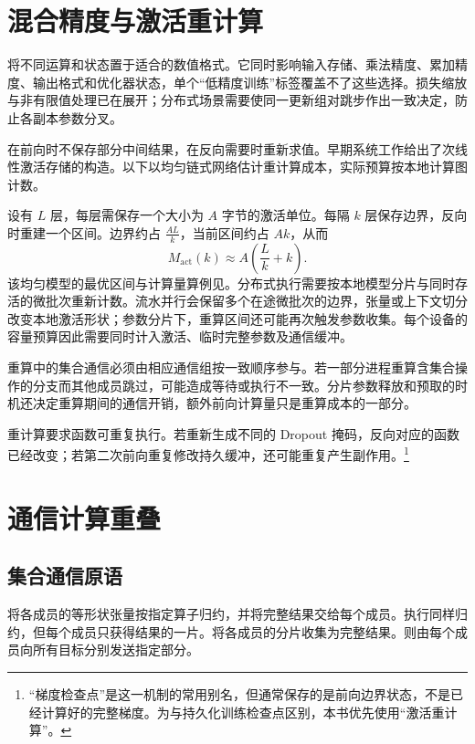 \documentclass[../textbook.tex]{subfiles}
\begin{document}
\section{混合精度与激活重计算}

将不同运算和状态置于适合的数值格式。它同时影响输入存储、乘法精度、累加精度、输出格式和优化器状态，单个“低精度训练”标签覆盖不了这些选择。损失缩放与非有限值处理已在展开；分布式场景需要使同一更新组对跳步作出一致决定，防止各副本参数分叉。

在前向时不保存部分中间结果，在反向需要时重新求值。早期系统工作给出了次线性激活存储的构造\autocite{chen2016sublinear}。以下以均匀链式网络估计重计算成本，实际预算按本地计算图计数。

设有 $L$ 层，每层需保存一个大小为 $A$ 字节的激活单位。每隔 $k$ 层保存边界，反向时重建一个区间。边界约占 $\frac{AL}{k}$，当前区间约占 $Ak$，从而
\begin{equation}
 M_{\mathrm{act}}(k)\approx A(\frac{L}{k}+k).
 \label{eq:dist-recompute-memory}
\end{equation}
该均匀模型的最优区间与计算量算例见。分布式执行需要按本地模型分片与同时存活的微批次重新计数。流水并行会保留多个在途微批次的边界，张量或上下文切分改变本地激活形状；参数分片下，重算区间还可能再次触发参数收集。每个设备的容量预算因此需要同时计入激活、临时完整参数及通信缓冲。

重算中的集合通信必须由相应通信组按一致顺序参与。若一部分进程重算含集合操作的分支而其他成员跳过，可能造成等待或执行不一致。分片参数释放和预取的时机还决定重算期间的通信开销，额外前向计算量只是重算成本的一部分。

重计算要求函数可重复执行。若重新生成不同的 Dropout 掩码，反向对应的函数已经改变；若第二次前向重复修改持久缓冲，还可能重复产生副作用。\footnote{“梯度检查点”是这一机制的常用别名，但通常保存的是前向边界状态，不是已经计算好的完整梯度。为与持久化训练检查点区别，本书优先使用“激活重计算”。}

\section{通信计算重叠}

\subsection{集合通信原语}
将各成员的等形状张量按指定算子归约，并将完整结果交给每个成员。执行同样归约，但每个成员只获得结果的一片。将各成员的分片收集为完整结果。则由每个成员向所有目标分别发送指定部分。
\end{document}
